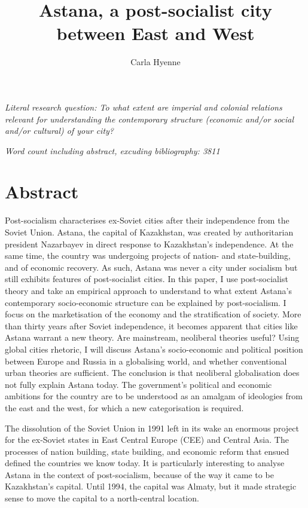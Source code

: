 \documentclass{article}
\title{Astana, a post-socialist city between East and West}
\author{Carla Hyenne}
\date{}
\begin{document}
\maketitle 

\begin{center}
\textit{Literal research question: To what extent are imperial and colonial relations relevant for understanding the contemporary structure (economic and/or social and/or cultural) of your city?}

\textit{Word count including abstract, excuding bibliography: 3811}

\end{center}

\section{Abstract}

Post-socialism characterises ex-Soviet cities after their independence from the Soviet Union.
Astana, the capital of Kazakhstan, was created by authoritarian president Nazarbayev in direct response to Kazakhstan's independence. At the same time, the country was undergoing projects of nation- and state-building, and of economic recovery. As such, Astana was never a city under socialism but still exhibits features of post-socialist cities. In this paper, I use post-socialist theory and take an empirical approach to understand to what extent Astana's contemporary socio-economic structure can be explained by post-socialism. 
I focus on the marketisation of the economy and the stratification of society. 
More than thirty years after Soviet independence, it becomes apparent that cities like Astana warrant a new theory. 
Are mainstream, neoliberal theories useful? Using global cities rhetoric, I will discuss Astana's socio-economic and political position between Europe and Russia in a globalising world, and whether conventional urban theories are sufficient. 
The conclusion is that neoliberal globalisation does not fully explain Astana today. The government's political and economic ambitions for the country are to be understood as an amalgam of ideologies from the east and the west, for which a new categorisation is required.

\pagebreak

The dissolution of the Soviet Union in 1991 left in its wake an enormous project for the ex-Soviet states in East Central Europe (CEE) and Central Asia. The processes of nation building, state building, and economic reform that ensued defined the countries we know today. It is particularly interesting to analyse Astana in the context of post-socialism, because of the way it came to be Kazakhstan's capital. 
Until 1994, the capital was Almaty, but it made strategic sense to move the capital to a north-central location. 
\end{document}
